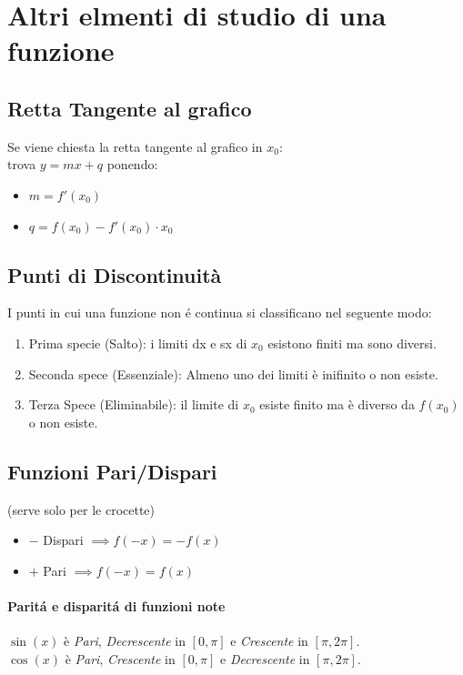 \documentclass[12pt, a4paper, openany]{book}
\begin{document}
\section{Altri elmenti di studio di una funzione}
\subsection{Retta Tangente al grafico}
Se viene chiesta la retta tangente al grafico in $x_0$:\\
trova $y=mx + q$ ponendo:
\begin{itemize}
	\item $m=f'(x_0)$
	\item $q=f(x_0)-f'(x_0)\cdot x_0$
\end{itemize}

\subsection{Punti di Discontinuità}
I punti in cui una funzione non é continua si classificano nel seguente modo:
\begin{enumerate}
	\item Prima specie (Salto): i limiti dx e sx di $x_0$ esistono finiti ma sono diversi.
	\item Seconda spece (Essenziale): Almeno uno dei limiti è inifinito o non esiste.
	\item Terza Spece (Eliminabile): il limite di $x_0$ esiste finito ma è diverso da $f(x_0)$ o non esiste.
\end{enumerate}

\subsection{Funzioni Pari/Dispari}
\small{(serve solo per le crocette)}
\begin{itemize}
	\item $-$ Dispari $\implies f(-x)=-f(x)$
	\item $+$ Pari $\implies f(-x)=f(x)$
\end{itemize}
\paragraph*{Paritá e disparitá di funzioni note}

$\sin(x)$ è \emph{Pari}, \emph{Decrescente} in $[0,\pi]$ e \emph{Crescente} in $[\pi,2\pi]$.
\\$\cos(x)$ è \emph{Pari}, \emph{Crescente} in $[0,\pi]$ e \emph{Decrescente} in $[\pi,2\pi]$.
\end{document}
